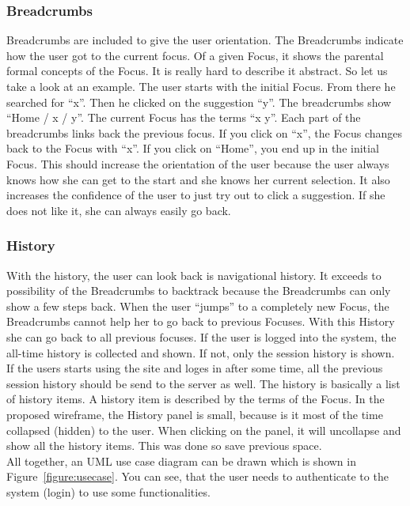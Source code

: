 \documentclass[11pt]{report}
\begin{document}
\subsubsection{Breadcrumbs}

Breadcrumbs are included to give the user orientation. The Breadcrumbs indicate how the user got to the current focus. Of a given Focus, it shows the parental formal concepts of the Focus. It is really hard to describe it abstract. So let us take a look at an example. The user starts with the initial Focus. From there he searched for ``x''. Then he clicked on the suggestion ``y''. The breadcrumbs show ``Home / x / y''. The current Focus has the terms ``x y''. Each part of the breadcrumbs links back the previous focus. If you click on ``x'', the Focus changes back to the Focus with ``x''. If you click on ``Home'', you end up in the initial Focus. This should increase the orientation of the user because the user always knows how she can get to the start and she knows her current selection. It also increases the confidence of the user to just try out to click a suggestion. If she does not like it, she can always easily go back. 

\subsubsection{History}

With the history, the user can look back is navigational history. It exceeds to possibility of the Breadcrumbs to backtrack because the Breadcrumbs can only show a few steps back. When the user ``jumps'' to a completely new Focus, the Breadcrumbs cannot help her to go back to previous Focuses. With this History she can go back to all previous focuses. If the user is logged into the system, the all-time history is collected and shown. If not, only the session history is shown. If the users starts using the site and loges in after some time, all the previous session history should be send to the server as well. The history is basically a list of history items. A history item is described by the terms of the Focus. In the proposed wireframe, the History panel is small, because is it most of the time collapsed (hidden) to the user. When clicking on the panel, it will uncollapse and show all the history items. This was done so save previous space.\\

All together, an UML use case diagram can be drawn which is shown in Figure~\ref{figure:usecase}. You can see, that the user needs to authenticate to the system (login) to use some functionalities.
\end{document}
